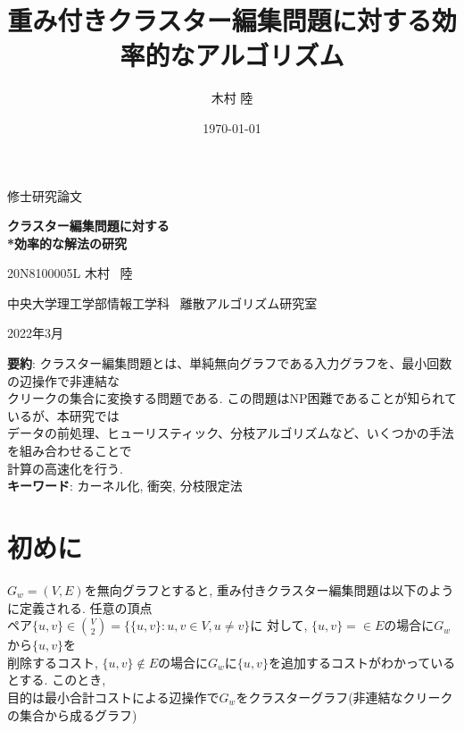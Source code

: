 \documentclass[10.5,a4paper,titlepage]{bxjsarticle}
\title{重み付きクラスター編集問題に対する効率的なアルゴリズム}
\author{木村 陸}
\date{\today}
\begin{document}
\begin{center}
    \huge 修士研究論文 \par
    \vspace{30mm}
    \huge \textbf{クラスター編集問題に対する\\*効率的な解法の研究} \par
    \vspace{30mm}
    \Large 20N8100005L 木村 \ 陸 \par
    \vspace{30mm}
    \Large 中央大学理工学部情報工学科 \  離散アルゴリズム研究室 \par
    \vspace{30mm}
    \Large 2022年3月
    \vspace{30mm}
\end{center}
\thispagestyle{empty}
\clearpage
\addtocounter{page}{-1}

\textbf{要約}: クラスター編集問題とは、単純無向グラフである入力グラフを、最小回数の辺操作で非連結な\\

クリークの集合に変換する問題である.
この問題はNP困難であることが知られているが、本研究では\\

データの前処理、ヒューリスティック、分枝アルゴリズムなど、いくつかの手法を組み合わせることで\\

計算の高速化を行う.\\


\textbf{キーワード}: カーネル化, 衝突, 分枝限定法
\clearpage

\tableofcontents
\clearpage

\section{初めに}
\setcounter{page}{1}
$G_w=(V,E)$を無向グラフとすると, 重み付きクラスター編集問題は以下のように定義される. 任意の頂点\\

ペア$\{u,v\} \in \binom{V}{2}= \{\{u,v\} : u,v \in V, u \neq v\}$に
対して, $\{u,v\} = \in E$の場合に$G_w$から$\{u,v\}$を\\

削除するコスト, $\{u,v\} \notin E$の場合に$G_w$に$\{u,v\}$を追加するコストがわかっているとする.
このとき, \\

目的は最小合計コストによる辺操作で$G_w$をクラスターグラフ(非連結なクリークの集合から成るグラフ)\\
\end{document}
